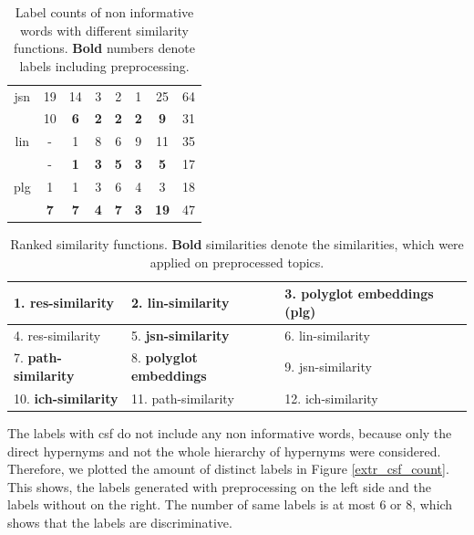 {\begin{table}[h]
\begin{tabular}{c|c|c|c|c|c|c|c}
		\hline
		jsn& 19		&14				  &3	   &2      &1       &25 &64\\
		&10 		&\textbf{6}	 &\textbf{2}  &\textbf{2} &\textbf{2} &\textbf{9} &31\\
		\hline
		lin& -		&1				  &8	   &6      &9       &11 &35\\
		& -	 	&\textbf{1}	 &\textbf{3}  &\textbf{5} &\textbf{3} &\textbf{5} &17\\
		\hline
		plg& 1		&1		 &3	   &6      &4       &3 &18\\
		& \textbf{7}&\textbf{7}	 &\textbf{4}  &\textbf{7} &\textbf{3} &\textbf{19} & 47\\
	\end{tabular}
	\caption[Label counts of non informative words]{Label counts of non informative words with different similarity functions. \textbf{Bold} numbers denote labels including preprocessing.}
	\label{tab:label_count_non_informative}
\end{table}
\begin{table}[h]
	\begin{tabular}{|l|l|l|}
		\hline
		1. \textbf{res-similarity} &2. \textbf{lin-similarity} &
		3. polyglot embeddings (plg) \\ 
		\hline
		4. res-similarity&5. \textbf{jsn-similarity}& 6. lin-similarity\\
		\hline
		7. \textbf{path-similarity} &8. \textbf{polyglot embeddings} &9. jsn-similarity \\ 
		\hline
		10. \textbf{ich-similarity}&11. path-similarity  &12. ich-similarity\\
		\hline
	\end{tabular}
\caption[Ranked similarity functions for extrinsic labeling]{Ranked similarity functions. \textbf{Bold} similarities denote the similarities, which were applied on preprocessed topics.}
\label{tab:ranked_non_info}
\end{table}
The labels with \ac{csf} do not include any non informative words, because only the direct hypernyms and not the whole hierarchy of hypernyms were considered. Therefore, we plotted the amount of distinct labels in Figure \ref{extr_csf_count}. This shows, the labels generated with preprocessing on the left side and the labels without on the right. The number of same labels is at most 6 or 8, which shows that the labels are discriminative.
\begin{figure}

\end{figure}}
